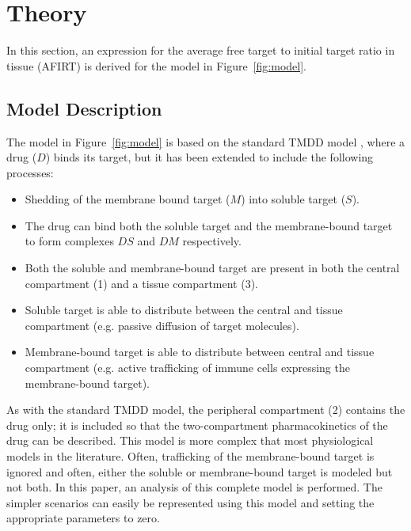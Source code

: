 \newcommand{\shedM}{\text{shedM}}
\newcommand{\shedDM}{\text{shedDM}}
\newcommand{\synM}{\text{synM}}
\newcommand{\synDM}{\text{synDM}}
\newcommand{\synS}{\text{synS}} 
\newcommand{\eM}{\text{e}M}  
\newcommand{\eS}{\text{e}S}  
\newcommand{\eDM}{\text{e}DM}   
\newcommand{\eDS}{\text{e}DS}
\newcommand{\totss}{\text{tot,ss}}
\newcommand{\Det}{(k_{\text{shed}M1} + k_{13M} + k_{\eM1})(k_{\text{shed}M3} + k_{31M} + k_{\eM3}) - k_{13M}k_{31M}}
\newcommand{\DetSS}{(k_{\text{shed}DM1} + k_{13DM} + k_{\eDM1})(k_{\text{shed}DM3} + k_{31DM} + k_{\eDM3})}

\section{Theory}

In this section, an expression for the average free target to initial target ratio in tissue (AFIRT) is derived for the model in Figure~\ref{fig:model}.

\subsection{Model Description}
The model in Figure~\ref{fig:model} is based on the standard TMDD model \cite{mager01, stein17}, where a drug ($D$) binds its target, but it has been extended to include the following processes:
\begin{itemize}
\item Shedding of the membrane bound target ($M$) into soluble target ($S$).  
\item The drug can bind both the soluble target and the membrane-bound target to form complexes $DS$ and $DM$ respectively.
\item Both the soluble and membrane-bound target are present in both the central compartment (1) and a tissue compartment (3).
\item Soluble target is able to distribute between the central and tissue compartment (e.g. passive diffusion of target molecules).
\item Membrane-bound target is able to  distribute between central and tissue compartment (e.g. active trafficking of immune cells expressing the membrane-bound target).
\end{itemize}
As with the standard TMDD model, the peripheral compartment (2) contains the drug only; it is included so that the two-compartment pharmacokinetics of the drug can be described.  This model is more complex that most physiological models in the literature.  Often, trafficking of the membrane-bound target is ignored and often, either the soluble or membrane-bound target is modeled but not both.  In this paper, an analysis of this complete model is performed.  The simpler scenarios can easily be represented using this model and setting the appropriate parameters to zero.  


